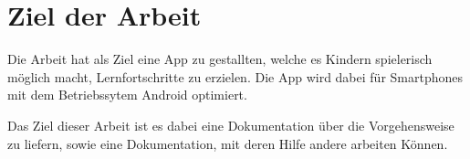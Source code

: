 \section{Ziel der Arbeit}

Die Arbeit hat als Ziel eine App zu gestallten, welche es Kindern spielerisch möglich macht, Lernfortschritte zu erzielen. Die App wird dabei für Smartphones mit dem Betriebssytem Android optimiert.

Das Ziel dieser Arbeit ist es dabei eine Dokumentation über die Vorgehensweise zu liefern, sowie eine Dokumentation, mit deren Hilfe andere arbeiten Können.